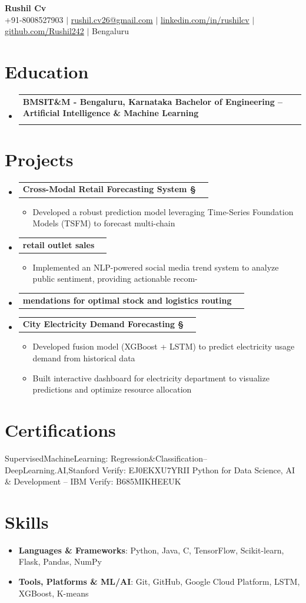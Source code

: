 \documentclass[letterpaper,11pt]{article}
\makeatletter
\newcommand{\resumeItem}[1]{
  \item\small{#1 \vspace{-2pt}}
}
\newcommand{\resumeSubheading}[4]{
  \vspace{-2pt}\item
  \begin{tabular*}{0.97\textwidth}[t]{l@{\extracolsep{\fill}}r}
    \textbf{#1} & #2 \\
    \textit{\small#3} & \textit{\small #4} \\
  \end{tabular*}\vspace{-7pt}
}
\newcommand{\resumeProjectHeading}[2]{
  \item
  \begin{tabular*}{0.97\textwidth}{l@{\extracolsep{\fill}}r}
    \small#1 & #2 \\
  \end{tabular*}\vspace{-7pt}
}
\newcommand{\resumeSkillHeading}[2]{
  \vspace{-2pt}\item
  {\textbf{\small#1}}{: \small#2}
}
\newcommand{\resumeSubHeadingListStart}{\begin{itemize}[leftmargin=0.15in, label={}]}
\newcommand{\resumeSubHeadingListEnd}{\end{itemize}}
\newcommand{\resumeItemListStart}{\begin{itemize}}
\newcommand{\resumeItemListEnd}{\end{itemize}\vspace{-5pt}}
\makeatother
\begin{document}
\begin{center}
  {\Huge \textbf{Rushil Cv}} \\[4pt]
  \small +91-8008527903 $|$ \href{mailto:rushil.cv26@gmail.com}{rushil.cv26@gmail.com} $|$ \href{linkedin.com/in/rushilcv}{linkedin.com/in/rushilcv} $|$ \href{github.com/Rushil242}{github.com/Rushil242} $|$ Bengaluru
\end{center}

\section{Education}
\resumeSubHeadingListStart
  \resumeSubheading{BMSIT\&M - Bengaluru, Karnataka Bachelor of Engineering – Artificial Intelligence \& Machine Learning}{}{}{}
\resumeSubHeadingListEnd

\section{Projects}
\resumeSubHeadingListStart
  \resumeProjectHeading{\textbf{Cross-Modal Retail Forecasting System §}}{}
  \resumeItemListStart
    \resumeItem{Developed a robust prediction model leveraging Time-Series Foundation Models (TSFM) to forecast multi-chain}
  \resumeItemListEnd
  \resumeProjectHeading{\textbf{retail outlet sales}}{}
  \resumeItemListStart
    \resumeItem{Implemented an NLP-powered social media trend system to analyze public sentiment, providing actionable recom-}
  \resumeItemListEnd
  \resumeProjectHeading{\textbf{mendations for optimal stock and logistics routing}}{}
  \resumeProjectHeading{\textbf{City Electricity Demand Forecasting §}}{}
  \resumeItemListStart
    \resumeItem{Developed fusion model (XGBoost + LSTM) to predict electricity usage demand from historical data}
    \resumeItem{Built interactive dashboard for electricity department to visualize predictions and optimize resource allocation}
  \resumeItemListEnd
\resumeSubHeadingListEnd

\section{Certifications}
SupervisedMachineLearning: Regression\&Classification–DeepLearning.AI,Stanford Verify: EJ0EKXU7YRII
Python for Data Science, AI \& Development – IBM Verify: B685MIKHEEUK

\section{Skills}
\resumeSubHeadingListStart
  \resumeSkillHeading{Languages \& Frameworks}{Python, Java, C, TensorFlow, Scikit-learn, Flask, Pandas, NumPy}
  \resumeSkillHeading{Tools, Platforms \& ML/AI}{Git, GitHub, Google Cloud Platform, LSTM, XGBoost, K-means}
\resumeSubHeadingListEnd
\end{document}
